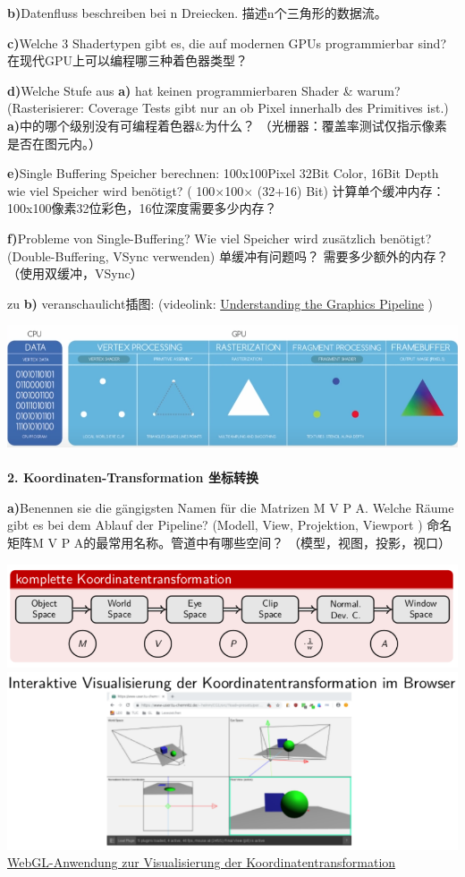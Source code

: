 \documentclass[fleqn]{article}
\begin{document}
\indent \textbf{b)}Datenfluss beschreiben bei n Dreiecken. 描述n个三角形的数据流。

\indent \textbf{c)}Welche 3 Shadertypen gibt es, die auf modernen GPUs programmierbar sind? 在现代GPU上可以编程哪三种着色器类型？

\indent \textbf{d)}Welche Stufe aus \textbf{a)} hat keinen programmierbaren Shader \& warum? (Rasterisierer: Coverage Tests gibt nur an ob Pixel innerhalb des Primitives ist.)
\textbf {a)}中的哪个级别没有可编程着色器\&为什么？ （光栅器：覆盖率测试仅指示像素是否在图元内。）

\indent \textbf{e)}Single Buffering Speicher berechnen: 100x100Pixel 32Bit Color, 16Bit Depth wie viel Speicher wird benötigt? ( 100$\times$100$\times$ (32+16) Bit)
计算单个缓冲内存：100x100像素32位彩色，16位深度需要多少内存？

\indent \textbf{f)}Probleme von Single-Buffering? Wie viel Speicher wird zusätzlich benötigt? (Double-Buffering, VSync verwenden)
单缓冲有问题吗？ 需要多少额外的内存？ （使用双缓冲，VSync）

zu \textbf{b)} veranschaulicht插图: (videolink: \href{https://youtu.be/0PTBOX1HHIo?t=175}{Understanding the Graphics Pipeline}  )

\includegraphics[scale=0.4]{2.png}
\\
\\
\textbf{2. Koordinaten-Transformation 坐标转换}

\indent\textbf{a)}Benennen sie die gängigsten Namen für die Matrizen M V P A. Welche Räume gibt es bei dem Ablauf der Pipeline? (Modell, View, Projektion, Viewport )
命名矩阵M V P A的最常用名称。管道中有哪些空间？ （模型，视图，投影，视口）

\begin{center}
    \includegraphics[scale=0.4]{3.png}
    \includegraphics[scale=0.6]{4.png}
    \href{https://www-user.tu-chemnitz.de/~malo/CG-I}{WebGL-Anwendung zur Visualisierung der Koordinatentransformation}
\end{center}
\end{document}
